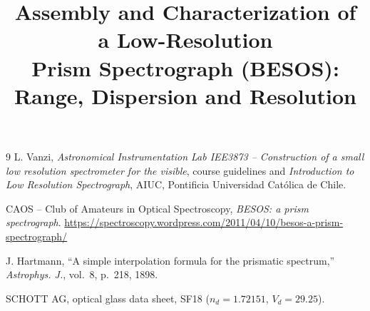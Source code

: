 \documentclass[conference]{IEEEtran}
\begin{document}
\title{Assembly and Characterization of a Low-Resolution\\
Prism Spectrograph (BESOS): Range, Dispersion and Resolution}

\author{
}

\maketitle








\begin{thebibliography}{9}
L. Vanzi, \emph{Astronomical Instrumentation Lab IEE3873 -- Construction of a small low resolution spectrometer for the visible}, course guidelines and \emph{Introduction to Low Resolution Spectrograph}, AIUC, Pontificia Universidad Cat\'olica de Chile.

CAOS -- Club of Amateurs in Optical Spectroscopy, \emph{BESOS: a prism spectrograph}. \url{https://spectroscopy.wordpress.com/2011/04/10/besos-a-prism-spectrograph/}

J. Hartmann, ``A simple interpolation formula for the prismatic spectrum,'' \emph{Astrophys. J.}, vol.~8, p.~218, 1898.

SCHOTT AG, optical glass data sheet, SF18 ($n_d=1.72151$, $V_d=29.25$).

\end{thebibliography}
\end{document}
